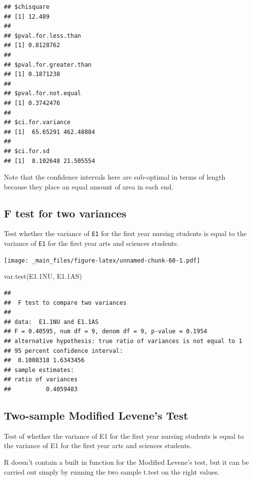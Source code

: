 \documentclass[
]{book}
\newenvironment{Shaded}{\begin{snugshade}}{\end{snugshade}}
\newcommand{\FloatTok}[1]{\textcolor[rgb]{0.00,0.00,0.81}{#1}}
\newcommand{\FunctionTok}[1]{\textcolor[rgb]{0.00,0.00,0.00}{#1}}
\newcommand{\NormalTok}[1]{#1}
\begin{document}
\begin{verbatim}
## $chisquare
## [1] 12.489
## 
## $pval.for.less.than
## [1] 0.8128762
## 
## $pval.for.greater.than
## [1] 0.1871238
## 
## $pval.for.not.equal
## [1] 0.3742476
## 
## $ci.for.variance
## [1]  65.65291 462.48884
## 
## $ci.for.sd
## [1]  8.102648 21.505554
\end{verbatim}

Note that the confidence intervals here are sub-optimal in terms of length because they place an equal amount of area in each end.

\hypertarget{f-test-for-two-variances}{%
\subsection{F test for two variances}\label{f-test-for-two-variances}}

Test whether the variance of \texttt{E1} for the first year nursing students is equal to the variance of \texttt{E1} for the first year arts and sciences students.

\texttt{[image: \_main\_files/figure-latex/unnamed-chunk-60-1.pdf]}

\begin{Shaded}
\begin{Highlighting}[]
\FunctionTok{var.test}\NormalTok{(E1}\FloatTok{.1}\NormalTok{NU, E1}\FloatTok{.1}\NormalTok{AS)}
\end{Highlighting}
\end{Shaded}

\begin{verbatim}
## 
##  F test to compare two variances
## 
## data:  E1.1NU and E1.1AS
## F = 0.40595, num df = 9, denom df = 9, p-value = 0.1954
## alternative hypothesis: true ratio of variances is not equal to 1
## 95 percent confidence interval:
##  0.1008318 1.6343456
## sample estimates:
## ratio of variances 
##          0.4059483
\end{verbatim}

\hypertarget{two-sample-modified-levenes-test}{%
\subsection{Two-sample Modified Levene's Test}\label{two-sample-modified-levenes-test}}

Test of whether the variance of E1 for the first year nursing students is equal to the variance of E1 for the first year arts and sciences students.

R doesn't contain a built in function for the Modified Levene's test, but it can be carried out simply by running the two sample t.test on the right values.
\end{document}
